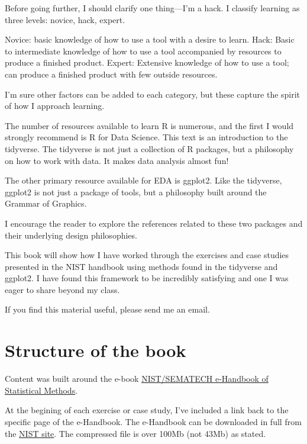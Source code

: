 \documentclass[]{book}
\theoremstyle{definition}
\theoremstyle{definition}
\theoremstyle{definition}
\theoremstyle{remark}
\begin{document}
Before going further, I should clarify one thing---I'm a hack. I
classify learning as three levels: novice, hack, expert.

Novice: basic knowledge of how to use a tool with a desire to learn.
Hack: Basic to intermediate knowledge of how to use a tool accompanied
by resources to produce a finished product. Expert: Extensive knowledge
of how to use a tool; can produce a finished product with few outside
resources.

I'm sure other factors can be added to each category, but these capture
the spirit of how I approach learning.

The number of resources available to learn R is numerous, and the first
I would strongly recommend is R for Data Science. This text is an
introduction to the tidyverse. The tidyverse is not just a collection of
R packages, but a philosophy on how to work with data. It makes data
analysis almost fun!

The other primary resource available for EDA is ggplot2. Like the
tidyverse, ggplot2 is not just a package of tools, but a philosophy
built around the Grammar of Graphics.

I encourage the reader to explore the references related to these two
packages and their underlying design philosophies.

This book will show how I have worked through the exercises and case
studies presented in the NIST handbook using methods found in the
tidyverse and ggplot2. I have found this framework to be incredibly
satisfying and one I was eager to share beyond my class.

If you find this material useful, please send me an email.

\hypertarget{structure-of-the-book}{%
\section*{Structure of the book}\label{structure-of-the-book}}

Content was built around the e-book
\href{https://www.itl.nist.gov/div898/handbook/index.htm}{NIST/SEMATECH
e-Handbook of Statistical Methods}.

At the begining of each exercise or case study, I've included a link
back to the specific page of the e-Handbook. The e-Handbook can be
downloaded in full from the
\href{https://www.itl.nist.gov/div898/handbook/toolaids/cd.htm}{NIST
site}. The compressed file is over 100Mb (not 43Mb) as stated.
\end{document}
